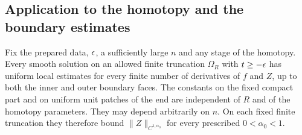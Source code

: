 \subsection{Application to the homotopy and the boundary estimates}

\begin{proposition}\label{four:prop:coupled-regularity}
Fix the prepared data, $\epsilon$, a sufficiently large $n$ and any
stage of the homotopy.  Every smooth solution on an allowed finite
truncation $\Omega_R$ with $t\ge-\epsilon$ has uniform local estimates
for every finite number of derivatives of $f$ and $Z$, up to both
the inner and outer boundary faces.  The constants on the fixed
compact part and on uniform unit patches of the end are independent
of $R$ and of the homotopy parameters.  They may depend arbitrarily
on $n$.  On each fixed finite truncation they therefore bound
$\|Z\|_{C^{1,\alpha_0}}$ for every prescribed $0<\alpha_0<1$.
\end{proposition}

